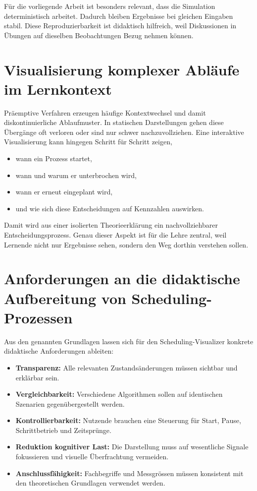 Für die vorliegende Arbeit ist besonders relevant, dass die Simulation deterministisch arbeitet. Dadurch bleiben Ergebnisse bei gleichen Eingaben stabil. Diese Reproduzierbarkeit ist didaktisch hilfreich, weil Diskussionen in Übungen auf dieselben Beobachtungen Bezug nehmen können.

\section{Visualisierung komplexer Abläufe im Lernkontext}

Präemptive Verfahren erzeugen häufige Kontextwechsel und damit diskontinuierliche Ablaufmuster. In statischen Darstellungen gehen diese Übergänge oft verloren oder sind nur schwer nachzuvollziehen. Eine interaktive Visualisierung kann hingegen Schritt für Schritt zeigen,

\begin{itemize}
  \item wann ein Prozess startet,
  \item wann und warum er unterbrochen wird,
  \item wann er erneut eingeplant wird,
  \item und wie sich diese Entscheidungen auf Kennzahlen auswirken.
\end{itemize}

Damit wird aus einer isolierten Theorieerklärung ein nachvollziehbarer Entscheidungsprozess. Genau dieser Aspekt ist für die Lehre zentral, weil Lernende nicht nur Ergebnisse sehen, sondern den Weg dorthin verstehen sollen.

\section{Anforderungen an die didaktische Aufbereitung von Scheduling-Prozessen}

Aus den genannten Grundlagen lassen sich für den Scheduling-Visualizer konkrete didaktische Anforderungen ableiten:

\begin{itemize}
  \item \textbf{Transparenz:} Alle relevanten Zustandsänderungen müssen sichtbar und erklärbar sein.
  \item \textbf{Vergleichbarkeit:} Verschiedene Algorithmen sollen auf identischen Szenarien gegenübergestellt werden.
  \item \textbf{Kontrollierbarkeit:} Nutzende brauchen eine Steuerung für Start, Pause, Schrittbetrieb und Zeitsprünge.
  \item \textbf{Reduktion kognitiver Last:} Die Darstellung muss auf wesentliche Signale fokussieren und visuelle Überfrachtung vermeiden.
  \item \textbf{Anschlussfähigkeit:} Fachbegriffe und Messgrössen müssen konsistent mit den theoretischen Grundlagen verwendet werden.
\end{itemize}

